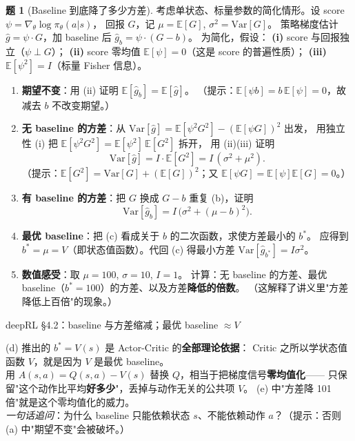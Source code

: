 \documentclass[11pt,a4paper]{article}
\theoremstyle{definition}
\newtheorem{problem}{题}
\begin{document}
\medskip

\begin{problem}[Baseline 到底降了多少方差]
考虑单状态、标量参数的简化情形。设 score $\psi = \nabla_\theta \log \pi_\theta(a|s)$，
回报 $G$，记 $\mu = \mathbb{E}[G]$, $\sigma^2 = \mathrm{Var}[G]$。
策略梯度估计 $\hat g = \psi \cdot G$，加 baseline 后 $\hat g_b = \psi \cdot (G - b)$。
为简化，假设：
\textbf{(i)} score 与回报独立（$\psi \perp G$）；
\textbf{(ii)} score 零均值 $\mathbb{E}[\psi] = 0$（这是 score 的普遍性质）；
\textbf{(iii)} $\mathbb{E}[\psi^2] = I$（标量 Fisher 信息）。

\begin{enumerate}[label=(\alph*)]
    \item \textbf{期望不变}：用 (ii) 证明 $\mathbb{E}[\hat g_b] = \mathbb{E}[\hat g]$。
    （提示：$\mathbb{E}[\psi b] = b\,\mathbb{E}[\psi] = 0$，故减去 $b$ 不改变期望。）
    
    \item \textbf{无 baseline 的方差}：从 $\mathrm{Var}[\hat g] = \mathbb{E}[\psi^2 G^2] - (\mathbb{E}[\psi G])^2$ 出发，
    用独立性 (i) 把 $\mathbb{E}[\psi^2 G^2] = \mathbb{E}[\psi^2]\,\mathbb{E}[G^2]$ 拆开，
    用 (ii)(iii) 证明
    \[
    \mathrm{Var}[\hat g] = I \cdot \mathbb{E}[G^2] = I\,(\sigma^2 + \mu^2).
    \]
    （提示：$\mathbb{E}[G^2] = \mathrm{Var}[G] + (\mathbb{E}[G])^2$；又 $\mathbb{E}[\psi G] = \mathbb{E}[\psi]\mathbb{E}[G] = 0$。）
    
    \item \textbf{有 baseline 的方差}：把 $G$ 换成 $G - b$ 重复 (b)，证明
    \[
    \mathrm{Var}[\hat g_b] = I\,\big(\sigma^2 + (\mu - b)^2\big).
    \]
    
    \item \textbf{最优 baseline}：把 (c) 看成关于 $b$ 的二次函数，求使方差最小的 $b^*$。
    应得到 $b^* = \mu = V$（即状态值函数）。代回 (c) 得最小方差 $\mathrm{Var}[\hat g_{b^*}] = I\sigma^2$。
    
    \item \textbf{数值感受}：取 $\mu = 100$, $\sigma = 10$, $I = 1$。
    计算：无 baseline 的方差、最优 baseline（$b^* = 100$）的方差、以及方差\textbf{降低的倍数}。
    （这解释了讲义里"方差降低上百倍"的现象。）
\end{enumerate}
\begin{topicbox}
deepRL §4.2：baseline 与方差缩减；最优 baseline $\approx V$
\end{topicbox}
\begin{takeaway}
(d) 推出的 $b^* = V(s)$ 是 Actor-Critic 的\textbf{全部理论依据}：
Critic 之所以学状态值函数 $V$，就是因为 $V$ 是最优 baseline。\\
用 $A(s,a) = Q(s,a) - V(s)$ 替换 $Q$，相当于把梯度信号\textbf{零均值化}——
只保留"这个动作比平均\textbf{好多少}"，丢掉与动作无关的公共项 $V$。
(e) 中"方差降 101 倍"就是这个零均值化的威力。\\
\textit{一句话追问}：为什么 baseline 只能依赖状态 $s$、不能依赖动作 $a$？（提示：否则 (a) 中"期望不变"会被破坏。）
\end{takeaway}
\end{problem}
\end{document}
